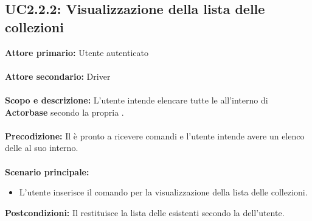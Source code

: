 \documentclass{scalatekids-article}
\begin{document}
\subsection{UC2.2.2: Visualizzazione della lista delle collezioni}

\textbf{Attore primario:} Utente autenticato\\ \\
\textbf{Attore secondario:} Driver\\ \\
\textbf{Scopo e descrizione:} L'utente intende elencare tutte le  all'interno di \textbf{Actorbase} secondo la propria .\\ \\
\textbf{Precodizione:} Il  è pronto a ricevere comandi e l'utente intende avere un elenco delle  al suo interno.\\ \\
\textbf{Scenario principale:}
\begin{itemize}
\item L'utente inserisce il comando per la visualizzazione della lista delle collezioni.
\end{itemize}
\textbf{Postcondizioni:} Il  restituisce la lista delle  esistenti secondo la  dell'utente.
\end{document}
